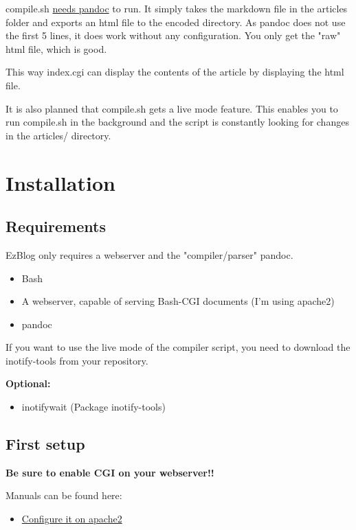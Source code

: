 \documentclass[12pt,a4paper]{article}
\begin{document}
compile.sh \hyperref[sec:req]{needs pandoc} to run. It simply takes the markdown file in the articles folder and exports an html file to the encoded directory. As pandoc does not use the first 5 lines, it does work without any configuration. You only get the "raw" html file, which is good.

This way index.cgi can display the contents of the article by displaying the html file.

It is also planned that compile.sh gets a live mode feature. This enables you to run compile.sh in the background and the script is constantly looking for changes in the articles/ directory.

\section{Installation}
\subsection{Requirements}
\label{sec:req}

EzBlog only requires a webserver and the "compiler/parser" pandoc. 

\begin{itemize}
\item Bash
\item A webserver, capable of serving Bash-CGI documents (I'm using apache2)
\item pandoc
\end{itemize}

If you want to use the live mode of the compiler script, you need to download the inotify-tools from your repository.

\textbf{Optional:}
\begin{itemize}
\item inotifywait (Package inotify-tools)
\end{itemize}

\subsection{First setup}

\textbf{Be sure to enable CGI on your webserver!!}

Manuals can be found here:

\begin{itemize}
\item \href{https://httpd.apache.org/docs/2.4/howto/cgi.html}{Configure it on apache2}
\end{itemize}
\end{document}
